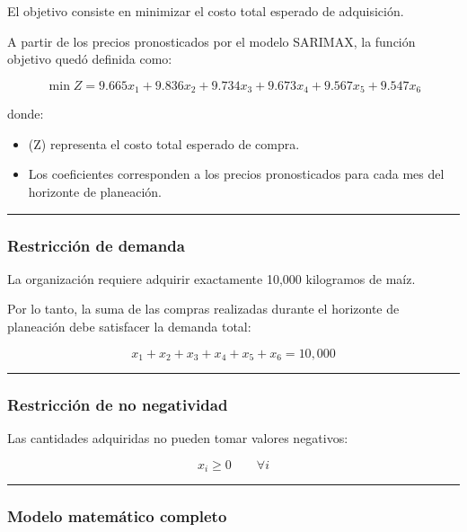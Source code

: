 \documentclass[11pt]{article}
\providecommand{\tightlist}{%
      \setlength{\itemsep}{0pt}\setlength{\parskip}{0pt}}
\begin{document}
El objetivo consiste en minimizar el costo total esperado de
adquisición.

A partir de los precios pronosticados por el modelo SARIMAX, la función
objetivo quedó definida como:

\[
\min Z =
9.665x_1 +
9.836x_2 +
9.734x_3 +
9.673x_4 +
9.567x_5 +
9.547x_6
\]

donde:

\begin{itemize}
\tightlist
\item
  (Z) representa el costo total esperado de compra.
\item
  Los coeficientes corresponden a los precios pronosticados para cada
  mes del horizonte de planeación.
\end{itemize}

\begin{center}\rule{0.5\linewidth}{0.5pt}\end{center}

\hypertarget{restricciuxf3n-de-demanda}{%
\subsubsection{Restricción de demanda}\label{restricciuxf3n-de-demanda}}

La organización requiere adquirir exactamente 10,000 kilogramos de maíz.

Por lo tanto, la suma de las compras realizadas durante el horizonte de
planeación debe satisfacer la demanda total:

\[
x_1+x_2+x_3+x_4+x_5+x_6=10,000
\]

\begin{center}\rule{0.5\linewidth}{0.5pt}\end{center}

\hypertarget{restricciuxf3n-de-no-negatividad}{%
\subsubsection{Restricción de no
negatividad}\label{restricciuxf3n-de-no-negatividad}}

Las cantidades adquiridas no pueden tomar valores negativos:

\[
x_i \geq 0
\qquad
\forall i
\]

\begin{center}\rule{0.5\linewidth}{0.5pt}\end{center}

\hypertarget{modelo-matemuxe1tico-completo}{%
\subsubsection{Modelo matemático
completo}\label{modelo-matemuxe1tico-completo}}
\end{document}
